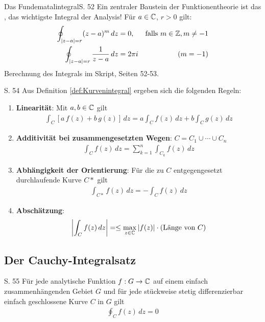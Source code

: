 \begin{bemerkung}{Das Fundematalintegral}{S. 52}
  Ein zentraler Baustein der Funktionentheorie ist das , das wichtigste Integral der Analysis!
  Für $a \in \mathbb{C}$, $r > 0$ gilt:
  \begin{align}
    \oint_{|z-a|=r} (z-a)^m \, dz &= 0, &\text{falls } m \in \mathbb{Z}, m \neq -1 \\
    \oint_{|z-a|=r} \frac{1}{z-a} \, dz &= 2 \pi i & (m = -1)
  \end{align}
  Berechnung des Integrals im Skript, Seiten 52-53.
\end{bemerkung}

\begin{satz}{S. 54}
  Aus Definition \ref{def:Kurvenintegral} ergeben sich die folgenden Regeln:
  \begin{enumerate}[label=\alph*)]
    \item \textbf{Linearität}: Mit $a, b \in \mathbb{C}$ gilt
      \begin{align}
        \int_C \left[ a \, f(z) + b \, g(z) \right] \, dz = a \int_C f(z) \, dz + b \int_C g(z) \, dz
      \end{align}
    \item \textbf{Additivität bei zusammengesetzten Wegen}: $C = C_1 \cup \cdots \cup C_n$
      \begin{align}
        \int_C f(z) \, dz = \sum_{k=1}^n \int_{C_k} f(z) \, dz
      \end{align}
    \item \textbf{Abhängigkeit der Orientierung}: Für die zu $C$ entgegengesetzt durchlaufende Kurve $C*$ gilt
      \begin{align}
        \int_{C*} f(z) \, dz = - \int_{C} f(z) \, dz
      \end{align}
    \item \textbf{Abschätzung}:
      \begin{align}
        \left| \int_{C} f(z) \, dz \right| = \leq \max_{z \in \mathbb{C}} \left| f(z) \right| \cdot (\text{Länge von } C)
      \end{align}
  \end{enumerate}
\end{satz}



\subsection{Der Cauchy-Integralsatz}

\begin{satz}{S. 55}
  Für jede analytische Funktion $f: G \to \mathbb{C}$ auf einem einfach zusammenhängenden Gebiet $G$ und für jede stückweise stetig differenzierbar einfach geschlossene Kurve $C$ in $G$ gilt
  \begin{align}
    \oint_C f(z) \, dz = 0
  \end{align}
\end{satz}

